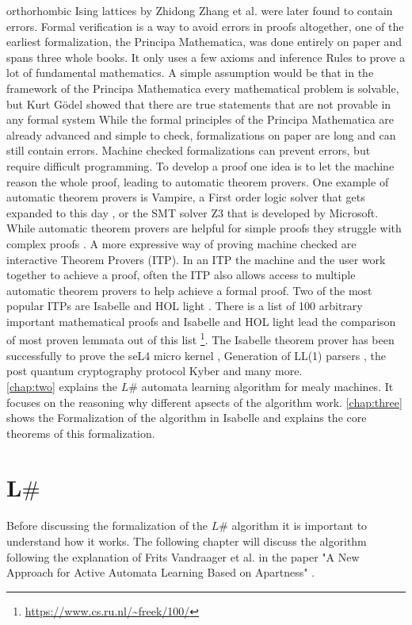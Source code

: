 orthorhombic Ising lattices by Zhidong Zhang et al. were later found to contain errors\cite{khovanova2011martingardnersmistake, perk2013erroneoussolutionthreedimensional3d}. Formal verification is a way to avoid errors in proofs altogether, one of the earliest formalization, the Principa Mathematica, was done entirely on paper and spans three whole books. It only uses a few axioms and inference Rules to prove a lot of fundamental mathematics. \cite{pincipa} A simple assumption would be that in the framework of the Principa Mathematica every mathematical problem is solvable, but Kurt Gödel showed that there are true statements that are not provable in any formal system \cite{godel}While the formal principles of the Principa Mathematica are already advanced and simple to check, formalizations on paper are long and can still contain errors. Machine checked formalizations can prevent errors, but require difficult programming. To develop a proof one idea is to let the machine reason the whole proof, leading to automatic theorem provers. One example of automatic theorem provers is Vampire, a First order logic solver that gets expanded to this day \cite{vampirediary}, or the SMT solver Z3 that is developed by Microsoft\cite{zthree}. While automatic theorem provers are helpful for simple proofs they struggle with complex proofs \cite{Blaauwbroek_2024}. A more expressive way of proving machine checked are interactive Theorem Provers (ITP). In an ITP the machine and the user work together to achieve a proof, often the ITP also allows access to multiple automatic theorem provers to help achieve a formal proof. Two of the most popular ITPs are Isabelle\cite{paulson2000isabelle700theoremprovers} and HOL light \cite{holligth}. There is a list of 100 arbitrary important mathematical proofs and Isabelle and HOL light lead the comparison of most proven lemmata out of this list \footnote{\url{https://www.cs.ru.nl/~freek/100/}}. The Isabelle theorem prover has been successfully to prove the seL4 micro kernel \cite{sel4}, Generation of LL(1) parsers \cite{LL1_Parser-AFP}, the post quantum cryptography protocol Kyber \cite{CRYSTALS-Kyber-AFP} and many more.\\
\autoref{chap:two} explains the $L\#$ automata learning algorithm for mealy machines. It focuses on the reasoning why different apsects of the algorithm work. \autoref{chap:three} shows the Formalization of the algorithm in Isabelle and explains the core theorems of this formalization.


\chapter{L$\#$} \label{chap:two}
Before discussing the formalization of the $L\#$ algorithm it is important to understand how it works. The following chapter will discuss the algorithm following the explanation of Frits Vandraager et al. in the paper "A New Approach for Active Automata Learning
Based on Apartness" \cite{vandraagerlsharp}.

